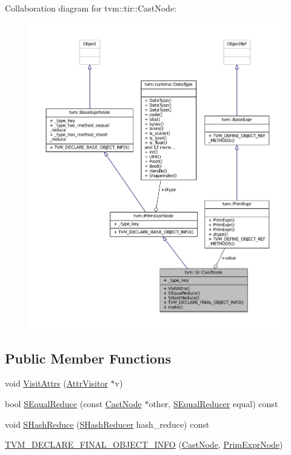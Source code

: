 Collaboration diagram for tvm\+:\+:tir\+:\+:Cast\+Node\+:
\nopagebreak
\begin{figure}[H]
\begin{center}
\leavevmode
\includegraphics[width=350pt]{classtvm_1_1tir_1_1CastNode__coll__graph}
\end{center}
\end{figure}
\subsection*{Public Member Functions}
\begin{DoxyCompactItemize}
\item 
void \hyperlink{classtvm_1_1tir_1_1CastNode_abd6f1cdacb178f35cdcf0800d46dd939}{Visit\+Attrs} (\hyperlink{classtvm_1_1AttrVisitor}{Attr\+Visitor} $\ast$v)
\item 
bool \hyperlink{classtvm_1_1tir_1_1CastNode_a94c826d3c645983d77c97bf7b4e839c7}{S\+Equal\+Reduce} (const \hyperlink{classtvm_1_1tir_1_1CastNode}{Cast\+Node} $\ast$other, \hyperlink{classtvm_1_1SEqualReducer}{S\+Equal\+Reducer} equal) const 
\item 
void \hyperlink{classtvm_1_1tir_1_1CastNode_aeb8aa253efdca1c975a3ab3e4443f824}{S\+Hash\+Reduce} (\hyperlink{classtvm_1_1SHashReducer}{S\+Hash\+Reducer} hash\+\_\+reduce) const 
\item 
\hyperlink{classtvm_1_1tir_1_1CastNode_ac25c688b4d081feffbba2feda042a700}{T\+V\+M\+\_\+\+D\+E\+C\+L\+A\+R\+E\+\_\+\+F\+I\+N\+A\+L\+\_\+\+O\+B\+J\+E\+C\+T\+\_\+\+I\+N\+FO} (\hyperlink{classtvm_1_1tir_1_1CastNode}{Cast\+Node}, \hyperlink{classtvm_1_1PrimExprNode}{Prim\+Expr\+Node})
\end{DoxyCompactItemize}
